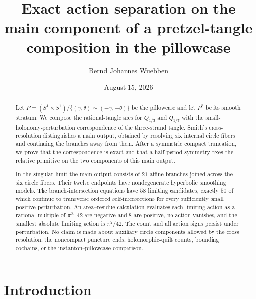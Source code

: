 \documentclass[11pt,reqno]{amsart}
\theoremstyle{plain}
\theoremstyle{definition}
\begin{document}
\title[Exact action separation in the pillowcase]
{Exact action separation on the main component of a pretzel-tangle composition in the pillowcase}

\author{Bernd Johannes Wuebben}
\date{August 15, 2026}

\begin{abstract}
Let $P=(S^1\times S^1)/\{(\gamma,\theta)\sim(-\gamma,-\theta)\}$ be the pillowcase and let
$P^*$ be its smooth stratum.  We compose the rational-tangle arcs for $Q_{1/3}$ and $Q_{1/7}$
with the small-holonomy-perturbation correspondence of the three-strand tangle.  Smith's
cross-resolution distinguishes a main output, obtained by resolving six internal circle fibers
and continuing the branches away from them.  After a symmetric compact truncation, we prove that
the correspondence is exact and that a half-period symmetry fixes the relative primitive on the
two components of this main output.

In the singular limit the main output consists of $21$ affine branches joined across the six
circle fibers.  Their twelve endpoints have nondegenerate hyperbolic smoothing models.  The
branch-intersection equations have $58$ limiting candidates, exactly $50$ of which continue to
transverse ordered self-intersections for every sufficiently small positive perturbation.  An
area--residue calculation evaluates each limiting action as a rational multiple of $\pi^2$:
$42$ are negative and $8$ are positive, no action vanishes, and the smallest absolute limiting
action is $\pi^2/42$.  The count and all action signs persist under perturbation.  No claim is made
about auxiliary circle components allowed by the cross-resolution, the noncompact puncture ends,
holomorphic-quilt counts, bounding cochains, or the instanton--pillowcase comparison.
\end{abstract}

\maketitle

\section{Introduction}
\end{document}
